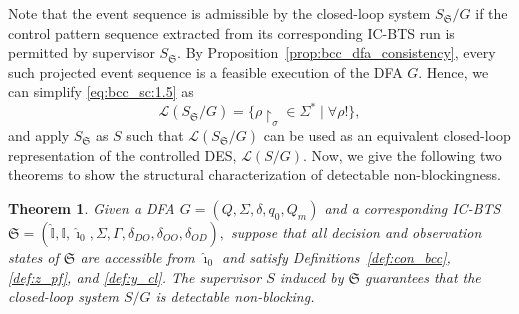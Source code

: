\documentclass[twocolumn]{autart}
\newtheorem{mythm}{\bf Theorem}
\begin{document}
Note that the event sequence is admissible by the closed-loop system $S_{\mathfrak{S}} / G$ if the control pattern sequence extracted from its corresponding IC-BTS run is permitted by supervisor $S_{\mathfrak{S}}$.
%
By Proposition~\ref{prop:bcc_dfa_consistency}, every such projected event sequence is a feasible execution of the DFA $G$.
Hence, we can simplify \ref{eq:bcc_sc:1.5} as
\begin{equation}\label{eq:bcc_sc:2}
    \mathcal{L}(S_{\mathfrak{S}} / G) = \{ \rho\restriction_{\sigma} \in \Sigma^* \mid \forall \rho! \},
\end{equation}
and apply $S_\mathfrak{S}$ as $S$ such that $\mathcal{L}(S_{\mathfrak{S}} / G)$ can be used as an equivalent closed-loop representation of the controlled DES, $\mathcal{L}(S/G)$.
%
Now, we give the following two theorems to show the structural characterization of detectable non-blockingness. 
%
\begin{mythm}\label{theo:cnb}
Given a DFA $G = (Q, \Sigma, \delta, q_0, Q_m)$ and a corresponding IC-BTS
$
\mathfrak{S} = (\hat{\mathbb{I}}, \mathbb{I}, \hat{\imath}_0, \Sigma, \Gamma, \delta_{DO}, \delta_{OO}, \delta_{OD}),
$
suppose that all decision and observation states of ${\mathfrak{S}}$ are accessible from $\hat{\imath}_0$ and satisfy Definitions~\ref{def:con_bcc}, \ref{def:z_pf}, and \ref{def:y_cl}.
The supervisor $S$ induced by ${\mathfrak{S}}$ guarantees that the closed-loop system $S/G$ is detectable non-blocking.
\end{mythm}
%
\end{document}
